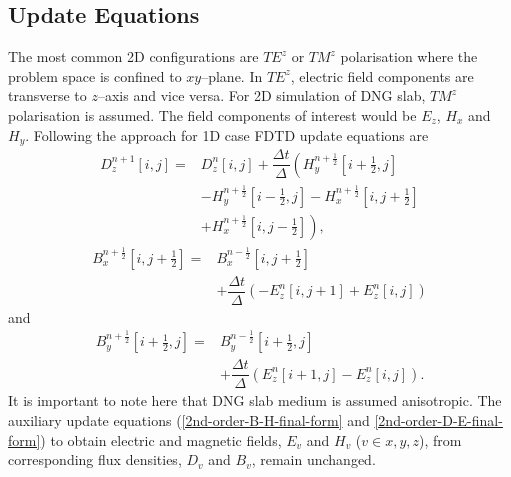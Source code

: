 \documentclass{article}
\begin{document}
\subsection{Update Equations}
The most common 2D configurations are $TE^z$ or $TM^z$ polarisation where the problem space is confined to $xy$--plane. In $TE^z$, electric field components are transverse to $z$--axis and vice versa. For 2D simulation of DNG slab, $TM^z$ polarisation is assumed. The field components of interest would be $E_z$, $H_x$ and $H_y$. Following the approach for 1D case FDTD update equations are
\begin{equation}
\begin{split}
D^{n+1}_z \left[i,j\right]=&D^{n}_z \left[i,j\right]+\dfrac{\Delta t}{\Delta}\left(H^{n+\frac{1}{2}}_y\left[i+\frac{1}{2},j\right]\right.\\
&\left.-H^{n+\frac{1}{2}}_y \left[i-\frac{1}{2},j\right]-H^{n+\frac{1}{2}}_x \left[i,j+\frac{1}{2}\right]\right.\\
&\left.+H^{n+\frac{1}{2}}_x \left[i,j-\frac{1}{2}\right]\right),
\end{split}
\label{eq:Dz-2D-FDTD-TMz}
\end{equation}
\begin{equation}
\begin{split}
B^{n+\frac{1}{2}}_x \left[i,j+\frac{1}{2}\right]=&B^{n-\frac{1}{2}}_x \left[i,j+\frac{1}{2}\right]\\& + \dfrac{\Delta t}{\Delta} \left(-E^{n}_z \left[i,j+1\right] + E^{n}_z \left[i,j\right] \right)
\end{split}
\label{eq:Bx-2D-FDTD-TMz}
\end{equation}
and
\begin{equation}
\begin{split}
B^{n+\frac{1}{2}}_y \left[i+\frac{1}{2},j\right]=&B^{n-\frac{1}{2}}_y \left[i+\frac{1}{2},j\right]\\& + \dfrac{\Delta t}{\Delta} \left( E^{n}_z \left[i+1,j\right] - E^{n}_z \left[i,j\right] \right).
\end{split}
\label{eq:By-2D-FDTD-TMz}
\end{equation}
It is important to note here that DNG slab medium is assumed anisotropic. The auxiliary update equations (\ref{2nd-order-B-H-final-form} and \ref{2nd-order-D-E-final-form}) to obtain electric and magnetic fields, $E_v$ and $H_v$ ($v\in x,y,z$), from corresponding flux densities, $D_v$ and $B_v$, remain unchanged.
\end{document}
